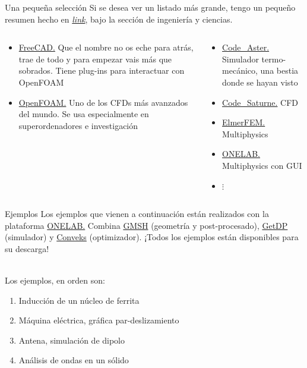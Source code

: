 \documentclass[12pt]{beamer}
\begin{document}
\begin{frame}{Una pequeña selección}
	Si se desea ver un listado más grande, tengo un pequeño resumen hecho en \textit{\href{https://github.com/Irvise/Documents/blob/master/Cheatsheets/Libre/Packages.md}{link}}, bajo la sección de ingeniería y ciencias.
	\begin{columns}
		\begin{column}{0.6\textwidth}
			\begin{itemize}
				\item \href{https://www.freecadweb.org/}{FreeCAD.} Que el nombre no os eche para atrás, trae de todo y para empezar vais más que sobrados. Tiene plug-ins para interactuar con OpenFOAM
				\item \href{https://openfoam.org/}{OpenFOAM.} Uno de los CFDs más avanzados del mundo. Se usa especialmente en superordenadores e investigación
			\end{itemize}
		\end{column}
		\begin{column}{0.5\textwidth}
			\begin{itemize}
				\item \href{https://code-aster.org/spip.php?rubrique2}{Code\_Aster.} Simulador termo-mecánico, una bestia donde se hayan visto
				\item \href{https://www.code-saturne.org/cms/}{Code\_Saturne.} CFD
				\item \href{http://www.elmerfem.org/blog/}{ElmerFEM.} Multiphysics
				\item \href{http://onelab.info/}{ONELAB.} Multiphysics con GUI
				\item $\vdots$
			\end{itemize}
		\end{column}
	\end{columns}
\end{frame}

\begin{frame}{Ejemplos}
	Los ejemplos que vienen a continuación están realizados con la plataforma \href{http://onelab.info/}{ONELAB.} Combina \href{http://gmsh.info/}{GMSH} (geometría y post-procesado), \href{http://getdp.info/}{GetDP} (simulador) y \href{http://onelab.info/conveks/}{Conveks} (optimizador). ¡Todos los ejemplos están disponibles para su descarga! \\~
	
	Los ejemplos, en orden son:
	\begin{enumerate}
		\item Inducción de un núcleo de ferrita
		\item Máquina eléctrica, gráfica par-deslizamiento
		\item Antena, simulación de dipolo
		\item Análisis de ondas en un sólido
	\end{enumerate}
\end{frame}
\end{document}
